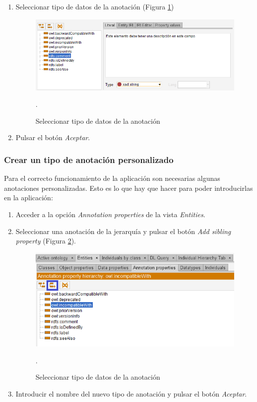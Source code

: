 \begin{enumerate}
    \item Seleccionar tipo de datos de la anotación (Figura \ref*{annotation_4})
    \begin{figure}[H]
        \centering
        \includegraphics[scale=0.6]{Figures/Protege/Annotations_3.png}
        \caption{Seleccionar tipo de datos de la anotación}.
        \label{annotation_4}
    \end{figure}

    \item Pulsar el botón \textit{Aceptar}.
\end{enumerate}

\subsubsection{Crear un tipo de anotación personalizado}
Para el correcto funcionamiento de la aplicación son necesarias algunas anotaciones personalizadas. Esto es lo que 
hay que hacer para poder introducirlas en la aplicación:

\begin{enumerate}
    \item Acceder a la opción \textit{Annotation properties} de la vista \textit{Entities}.
    \item Seleccionar una anotación de la jerarquía y pulsar el botón \textit{Add sibling property}
    (Figura \ref*{CustomAnnotations_1}).
    \begin{figure}[H]
        \centering
        \includegraphics[scale=0.6]{Figures/Protege/CustomAnnotations_1.png}
        \caption{Seleccionar tipo de datos de la anotación}.
        \label{CustomAnnotations_1}
    \end{figure}
    \item Introducir el nombre del nuevo tipo de anotación y pulsar el botón \textit{Aceptar}.
\end{enumerate}

